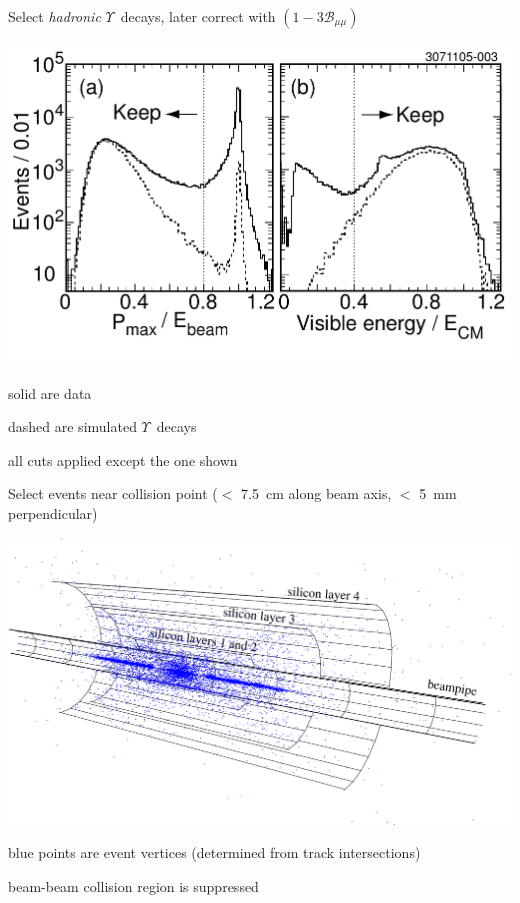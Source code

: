 \documentclass[landscape]{article}
\newcommand{\ups}{$\Upsilon$}
\begin{document}
\begin{slide:technique}

Select {\it hadronic} \ups\ decays, later correct with $(1 - 3{\mathcal B}_{\mu\mu})$

\vfill
\begin{center}
\includegraphics[width=0.8\linewidth]{plots/cuts}
\end{center}

\vspace{-1 cm}
solid are data

dashed are simulated \ups\ decays

all cuts applied except the one shown

\end{slide:technique}

\begin{slide:technique}

Select events near collision point ($<$ 7.5~cm along beam axis, $<$ 5~mm perpendicular)

\vfill
\begin{center}
\includegraphics[width=0.8\linewidth]{plots/snazzy3d}
\end{center}

blue points are event vertices (determined from track intersections)

beam-beam collision region is suppressed

\end{slide:technique}
\end{document}
